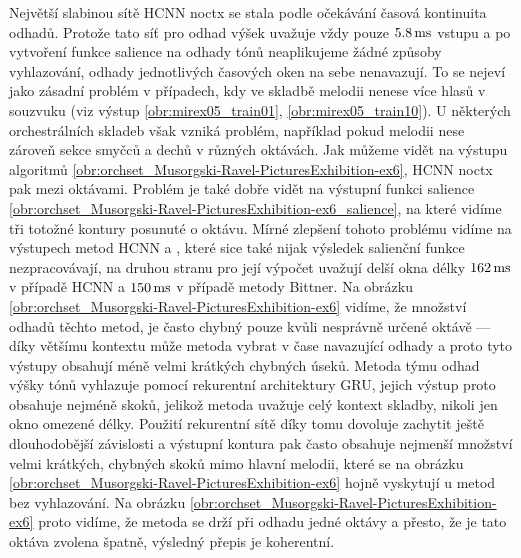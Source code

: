 Největší slabinou sítě HCNN noctx se stala podle očekávání časová kontinuita odhadů. Protože tato síť pro odhad výšek uvažuje vždy pouze $5.8\,\rm ms$ vstupu a po vytvoření funkce salience na odhady tónů neaplikujeme žádné způsoby vyhlazování, odhady jednotlivých časových oken na sebe nenavazují. To se nejeví jako zásadní problém v případech, kdy ve skladbě melodii nenese více hlasů v souzvuku (viz výstup \ref{obr:mirex05_train01}, \ref{obr:mirex05_train10}). U některých orchestrálních skladeb však vzniká problém, například pokud melodii nese zároveň sekce smyčců a dechů v různých oktávách. Jak můžeme vidět na výstupu algoritmů \ref{obr:orchset_Musorgski-Ravel-PicturesExhibition-ex6}, HCNN noctx pak  mezi oktávami. Problém je také dobře vidět na výstupní funkci salience \ref{obr:orchset_Musorgski-Ravel-PicturesExhibition-ex6_salience}, na které vidíme tři totožné kontury posunuté o oktávu. Mírné zlepšení tohoto problému vidíme na výstupech metod HCNN a \cite{Bittner2017}, které sice také nijak výsledek salienční funkce nezpracovávají, na druhou stranu pro její výpočet uvažují delší okna délky $162\,\rm ms$ v případě HCNN a $150\,\rm ms$ v případě metody Bittner. Na obrázku \ref{obr:orchset_Musorgski-Ravel-PicturesExhibition-ex6} vidíme, že množství odhadů těchto metod, je často chybný pouze kvůli nesprávně určené oktávě --- díky většímu kontextu může metoda vybrat v čase navazující odhady a proto tyto výstupy obsahují méně velmi krátkých chybných úseků. Metoda týmu \cite{DBasaranSEssid2018} odhad výšky tónů vyhlazuje pomocí rekurentní architektury GRU, jejich výstup proto obsahuje nejméně skoků, jelikož metoda uvažuje celý kontext skladby, nikoli jen okno omezené délky. Použití rekurentní sítě díky tomu dovoluje zachytit ještě dlouhodobější závislosti a výstupní kontura pak často obsahuje nejmenší množství velmi krátkých, chybných skoků mimo hlavní melodii, které se na obrázku \ref{obr:orchset_Musorgski-Ravel-PicturesExhibition-ex6} hojně vyskytují u metod bez vyhlazování. Na obrázku \ref{obr:orchset_Musorgski-Ravel-PicturesExhibition-ex6} proto vidíme, že metoda \cite{DBasaranSEssid2018} se drží při odhadu jedné oktávy a přesto, že je tato oktáva zvolena špatně, výsledný přepis je koherentní.



